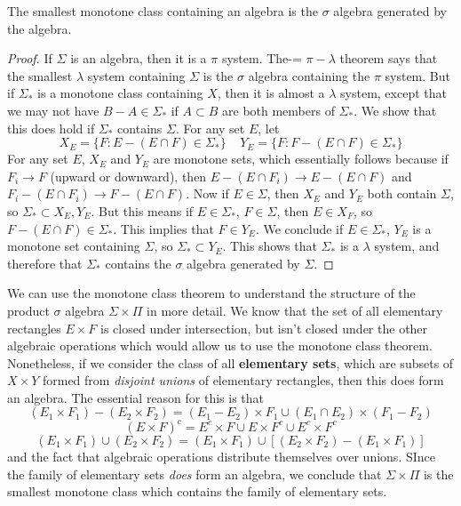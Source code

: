 \begin{theorem}
    The smallest monotone class containing an algebra is the $\sigma$ algebra generated by the algebra.
\end{theorem}
\begin{proof}
    If $\Sigma$ is an algebra, then it is a $\pi$ system. The-= $\pi-\lambda$ theorem says that the smallest $\lambda$ system containing $\Sigma$ is the $\sigma$ algebra containing the $\pi$ system. But if $\Sigma_*$ is a monotone class containing $X$, then it is almost a $\lambda$ system, except that we may not have $B - A \in \Sigma_*$ if $A \subset B$ are both members of $\Sigma_*$. We show that this does hold if $\Sigma_*$ contains $\Sigma$. For any set $E$, let
    \[ X_E = \{ F: E - (E \cap F) \in \Sigma_* \}\ \ \ \ \ Y_E = \{ F: F - (E \cap F) \in \Sigma_* \} \]
    For any set $E$, $X_E$ and $Y_E$ are monotone sets, which essentially follows because if $F_i \to F$ (upward or downward), then $E - (E \cap F_i) \to E - (E \cap F)$ and $F_i - (E \cap F_i) \to F - (E \cap F)$. Now if $E \in \Sigma$, then $X_E$ and $Y_E$ both contain $\Sigma$, so $\Sigma_* \subset X_E, Y_E$. But this means if $E \in \Sigma_*$, $F \in \Sigma$, then $E \in X_F$, so $F - (E \cap F) \in \Sigma_*$. This implies that $F \in Y_E$. We conclude if $E \in \Sigma_*$, $Y_E$ is a monotone set containing $\Sigma$, so $\Sigma_* \subset Y_E$. This shows that $\Sigma_*$ is a $\lambda$ system, and therefore that $\Sigma_*$ contains the $\sigma$ algebra generated by $\Sigma$.
\end{proof}

We can use the monotone class theorem to understand the structure of the product $\sigma$ algebra $\Sigma \times \Pi$ in more detail. We know that the set of all elementary rectangles $E \times F$ is closed under intersection, but isn't closed under the other algebraic operations which would allow us to use the monotone class theorem. Nonetheless, if we consider the class of all {\bf elementary sets}, which are subsets of $X \times Y$ formed from {\it disjoint unions} of elementary rectangles, then this does form an algebra. The essential reason for this is that
%
\[ (E_1 \times F_1) - (E_2 \times F_2) = (E_1 - E_2) \times F_1 \cup (E_1 \cap E_2) \times (F_1 - F_2) \]
\[ (E \times F)^c = E^c \times F \cup E \times F^c \cup E^c \times F^c \]
\[ (E_1 \times F_1) \cup (E_2 \times F_2) = (E_1 \times F_1) \cup [(E_2 \times F_2) - (E_1 \times F_1)] \]
%
and the fact that algebraic operations distribute themselves over unions. SInce the family of elementary sets {\it does} form an algebra, we conclude that $\Sigma \times \Pi$ is the smallest monotone class which contains the family of elementary sets.

